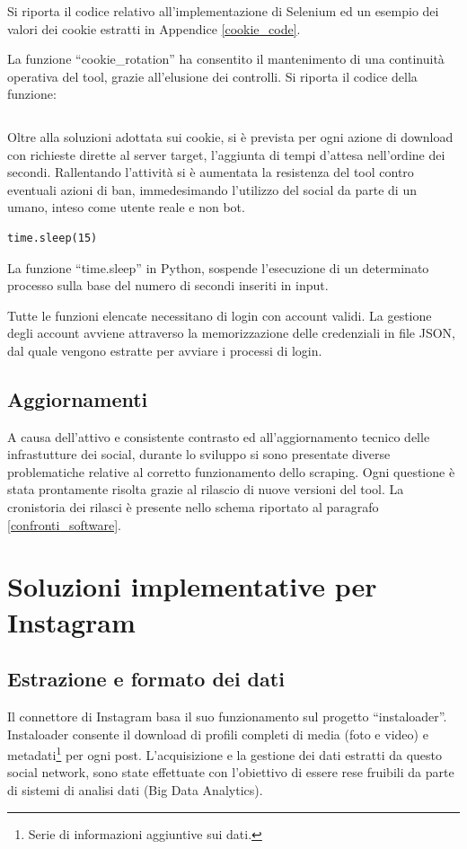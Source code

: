 Si riporta il codice relativo all'implementazione di Selenium ed un esempio dei valori dei cookie estratti in Appendice \ref{cookie_code}.

La funzione ``cookie\_rotation'' ha consentito il mantenimento di una continuit\`a operativa del tool, grazie all'elusione dei controlli.
Si riporta il codice della funzione:
\inputminted[bgcolor=bg]{python}{codice/cookie_rotation_fb.txt}

Oltre alla soluzioni adottata sui cookie, si \`e prevista per ogni azione di download con richieste dirette al server target, l'aggiunta di tempi d'attesa nell'ordine dei secondi. Rallentando l'attivit\`a si \`e aumentata la resistenza del tool contro eventuali azioni di ban, immedesimando l'utilizzo del social da parte di un umano, inteso come utente reale e non bot.
\begin{center}
\begin{verbatim}
time.sleep(15)
\end{verbatim}
\end{center}
La funzione ``time.sleep'' in Python, sospende l'esecuzione di un determinato processo sulla base del numero di secondi inseriti in input.

Tutte le funzioni elencate necessitano di login con account validi. La gestione degli account avviene attraverso la memorizzazione delle credenziali in file JSON, dal quale vengono estratte per avviare i processi di login.
\subsection{Aggiornamenti}
A causa dell'attivo e consistente contrasto ed all'aggiornamento tecnico delle infrastutture dei social, durante lo sviluppo si sono presentate diverse problematiche relative al corretto funzionamento dello scraping.
Ogni questione \`e stata prontamente risolta grazie al rilascio di nuove versioni del tool.
La cronistoria dei rilasci \`e presente nello schema riportato al paragrafo \ref{confronti_software}.

\section{Soluzioni implementative per Instagram}
\subsection{Estrazione e formato dei dati}
Il connettore di Instagram basa il suo funzionamento sul progetto ``instaloader''.
Instaloader consente il download di profili completi di media (foto e video) e metadati\footnote{Serie di informazioni aggiuntive sui dati.} per ogni post.
L'acquisizione e la gestione dei dati estratti da questo social network, sono state effettuate con l'obiettivo di essere rese fruibili da parte di sistemi di analisi dati (Big Data Analytics). 

